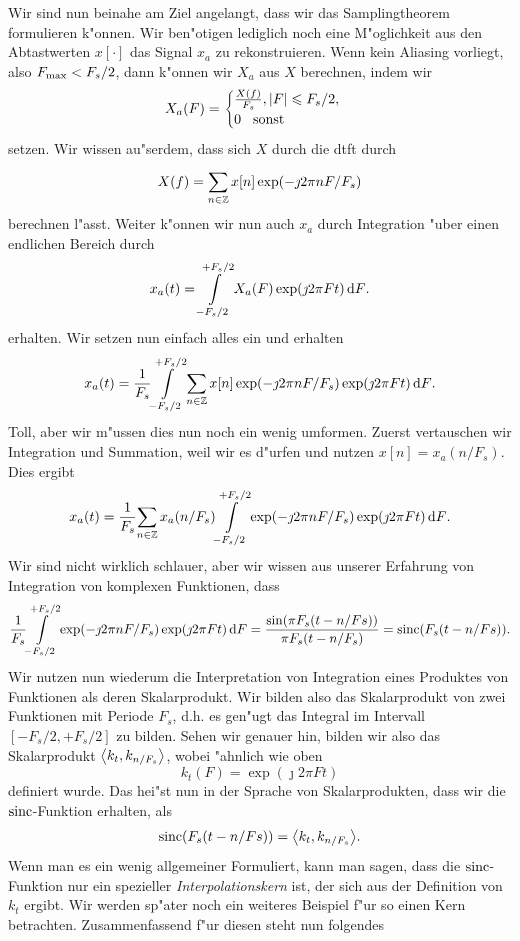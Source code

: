 Wir sind nun beinahe am Ziel angelangt, dass wir das Samplingtheorem formulieren k"onnen.
Wir ben"otigen lediglich noch eine M"oglichkeit aus den Abtastwerten $x[\cdot]$ das Signal $x_a$ zu rekonstruieren.
Wenn kein Aliasing vorliegt, also $F_{\rm max} < F_s/2$, dann k"onnen wir $X_a$ aus $X$ berechnen, indem wir
\[
X_a(F) = \begin{cases}
    \frac{X(f)}{F_s}, {\left| F \right|} \leqslant F_s/2, \\
    0 {\hspace{3mm} \text{sonst} \hspace{3mm}}
\end{cases}
\]
setzen.
Wir wissen au"serdem, dass sich $X$ durch die \gls{dtft} durch
\[
    X(f) = {\sum\limits_{n \in \mathbb{Z}}^{}{
        x[n] \exp(-\jmath 2 \pi n F/F_s)
    }}
\]
berechnen l"asst.
Weiter k"onnen wir nun auch $x_a$ durch Integration "uber einen endlichen Bereich durch
\[
    x_a(t) = {\int\limits_{-F_s/2}^{+F_s/2}{X_a(F) \exp(\jmath 2 \pi F t)}\,\mathrm{d}{F}}.
\]
erhalten. 
Wir setzen nun einfach alles ein und erhalten
\[
x_a(t) = \frac{1}{F_s}{\int\limits_{-F_s/2}^{+F_s/2}{
    {\sum\limits_{n \in \mathbb{Z}}^{}{
        x[n] \exp(-\jmath 2 \pi n F/F_s)
    }} 
    \exp(\jmath 2 \pi F t)}\,\mathrm{d}{F}}.
\]
Toll, aber wir m"ussen dies nun noch ein wenig umformen. Zuerst vertauschen wir Integration und Summation, weil wir es d"urfen und nutzen $x[n] = x_a(n/F_s)$. Dies ergibt
\[
x_a(t) = \frac{1}{F_s}{\sum\limits_{n \in \mathbb{Z}}^{}{
            x_a(n/F_s)
            {\int\limits_{-F_s/2}^{+F_s/2}{
                \exp(-\jmath 2 \pi n F/F_s)
                \exp(\jmath 2 \pi F t)
            }\,\mathrm{d}{F}}
        }}.
\]
Wir sind nicht wirklich schlauer, aber wir wissen aus unserer Erfahrung von Integration von komplexen Funktionen, dass
\[
    \frac{1}{F_s}{\int\limits_{-F_s/2}^{+F_s/2}{
        \exp(-\jmath 2 \pi n F/F_s)
        \exp(\jmath 2 \pi F t)
    }\,\mathrm{d}{F}} = \frac{\sin(\pi F_s (t - n/Fs))}{\pi F_s (t - n/F_s)} = \operatorname*{sinc}(F_s (t - n/Fs)).
\]
Wir nutzen nun wiederum die Interpretation von Integration eines Produktes von Funktionen als deren Skalarprodukt.
Wir bilden also das Skalarprodukt von zwei Funktionen mit Periode $F_s$, d.h. es gen"ugt das Integral im Intervall $[-F_s/2, +F_s/2]$ zu bilden.
Sehen wir genauer hin, bilden wir also das Skalarprodukt ${\left\langle k_t,k_{n/F_s} \right\rangle}$, wobei "ahnlich wie oben
\[
k_t(F) = \exp(\jmath 2 \pi F t)
\]
definiert wurde.
Das hei"st nun in der Sprache von Skalarprodukten, dass wir die $\operatorname*{sinc}$-Funktion erhalten, als
\[
    \operatorname*{sinc}(F_s (t - n/Fs)) = {\left\langle k_t,k_{n/F_s} \right\rangle}.
\]
Wenn man es ein wenig allgemeiner Formuliert, kann man sagen, dass die $\operatorname*{sinc}$-Funktion nur ein spezieller \emph{Interpolationskern} ist, der sich aus der Definition von $k_t$ ergibt.
Wir werden sp"ater noch ein weiteres Beispiel f"ur so einen Kern betrachten. Zusammenfassend f"ur diesen  steht nun folgendes
